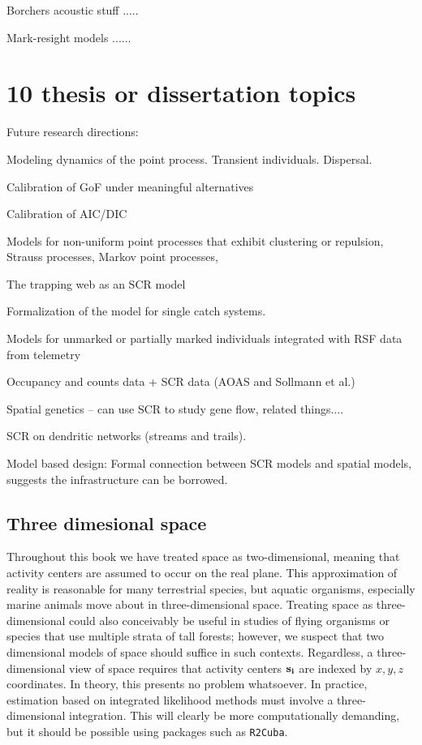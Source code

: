 Borchers acoustic stuff .....

Mark-resight models ......


\section{10 thesis or dissertation topics}

Future research directions:

Modeling dynamics of the point process. Transient individuals. 
Dispersal. 

Calibration of GoF under meaningful alternatives

Calibration of AIC/DIC 

Models for non-uniform point processes that exhibit clustering or
repulsion, Strauss processes, Markov point processes, 

The trapping web as an SCR model 

Formalization of the model for single catch systems. 

Models for unmarked or partially marked individuals integrated with
RSF data from telemetry

Occupancy and counts data + SCR data (AOAS and Sollmann et al.)

Spatial genetics  -- can use SCR to study gene flow, related things....

SCR on dendritic networks (streams and trails).

Model based design: Formal connection between SCR models and spatial
models, suggests the infrastructure can be borrowed.

\subsection{Three dimesional space}

Throughout this book we have treated space as
two-dimensional, meaning that activity centers are assumed to occur on
the real plane. This approximation of reality is reasonable for many
terrestrial species, but aquatic organisms, especially marine animals
move about in three-dimensional space. Treating space as
three-dimensional could also conceivably be useful in studies of flying organisms
or species that use multiple strata of tall forests; however, we
suspect that two dimensional models of space should suffice in such
contexts. Regardless, a three-dimensional view of space requires that
activity centers $\bf s_i$ are indexed by
$x,y,z$ coordinates. In theory, this presents no problem whatsoever. In
practice, estimation based on integrated likelihood methods must
involve a three-dimensional integration. This will clearly be more
computationally demanding, but it should be possible using packages
such as {\tt R2Cuba}.




